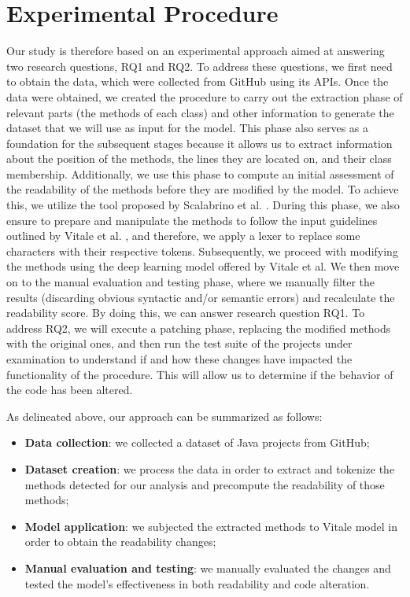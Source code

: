 \section{Experimental Procedure}
Our study is therefore based on an experimental approach aimed at answering two research questions, RQ1 and RQ2. To address these questions, we first need to obtain the data, which were collected from GitHub using its APIs. Once the data were obtained, we created the procedure to carry out the extraction phase of relevant parts (the methods of each class) and other information to generate the dataset that we will use as input for the model. This phase also serves as a foundation for the subsequent stages because it allows us to extract information about the position of the methods, the lines they are located on, and their class membership. Additionally, we use this phase to compute an initial assessment of the readability of the methods before they are modified by the model. To achieve this, we utilize the tool proposed by Scalabrino et al. \cite{Scalabrino2018}. During this phase, we also ensure to prepare and manipulate the methods to follow the input guidelines outlined by Vitale et al. \cite{Vitale2023}, and therefore, we apply a lexer to replace some characters with their respective tokens. Subsequently, we proceed with modifying the methods using the deep learning model offered by Vitale et al. We then move on to the manual evaluation and testing phase, where we manually filter the results (discarding obvious syntactic and/or semantic errors) and recalculate the readability score. By doing this, we can answer research question RQ1.\newline
To address RQ2, we will execute a patching phase, replacing the modified methods with the original ones, and then run the test suite of the projects under examination to understand if and how these changes have impacted the functionality of the procedure. This will allow us to determine if the behavior of the code has been altered.

As delineated above, our approach can be summarized as follows:
\begin{itemize}
	\item \textbf{Data collection}: we collected a dataset of Java projects from GitHub;
	\item  \textbf{Dataset creation}: we process the data in order to extract and tokenize the methods detected for our analysis and precompute the readability of those methods;
	\item \textbf{Model application}: we subjected the extracted methods to Vitale model in order to obtain the readability changes;
	\item \textbf{Manual evaluation and testing}: we manually evaluated the changes and tested the model's effectiveness in both readability and code alteration.
\end{itemize}

